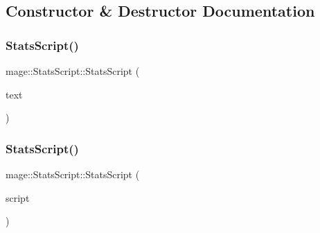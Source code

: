 \subsection{Constructor \& Destructor Documentation}
\hypertarget{classmage_1_1_stats_script_a5d2042950a17b62004adead100eb07e1}{}\label{classmage_1_1_stats_script_a5d2042950a17b62004adead100eb07e1} 
\subsubsection{\texorpdfstring{Stats\+Script()}{StatsScript()}\hspace{0.1cm}{\footnotesize\ttfamily [1/3]}}
{\footnotesize\ttfamily mage\+::\+Stats\+Script\+::\+Stats\+Script (\begin{DoxyParamCaption}\item[{\hyperlink{namespacemage_a1e01ae66713838a7a67d30e44c67703e}{Shared\+Ptr}$<$ \hyperlink{classmage_1_1_sprite_text}{Sprite\+Text} $>$}]{text }\end{DoxyParamCaption})\hspace{0.3cm}{\ttfamily [explicit]}}

\hypertarget{classmage_1_1_stats_script_aab237b7c391d7ca7ad96cfa33a3aac81}{}\label{classmage_1_1_stats_script_aab237b7c391d7ca7ad96cfa33a3aac81} 
\subsubsection{\texorpdfstring{Stats\+Script()}{StatsScript()}\hspace{0.1cm}{\footnotesize\ttfamily [2/3]}}
{\footnotesize\ttfamily mage\+::\+Stats\+Script\+::\+Stats\+Script (\begin{DoxyParamCaption}\item[{const \hyperlink{classmage_1_1_stats_script}{Stats\+Script} \&}]{script }\end{DoxyParamCaption})\hspace{0.3cm}{\ttfamily [delete]}}

\hypertarget{classmage_1_1_stats_script_af511d7e2e6bec30cd05782de94c65abe}{}\label{classmage_1_1_stats_script_af511d7e2e6bec30cd05782de94c65abe} 
